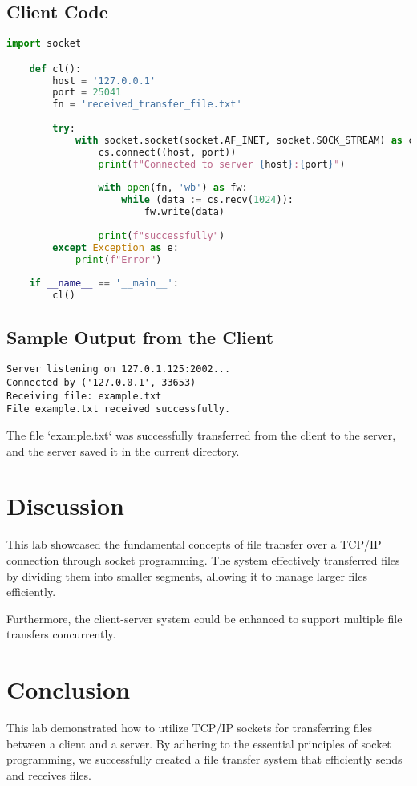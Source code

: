 \documentclass[a4paper,12pt]{article}
\begin{document}
\subsection{Client Code}

\begin{lstlisting}[language=Python, caption=Client Code]
    import socket

    def cl():
        host = '127.0.0.1'
        port = 25041
        fn = 'received_transfer_file.txt'
    
        try:
            with socket.socket(socket.AF_INET, socket.SOCK_STREAM) as cs:
                cs.connect((host, port))
                print(f"Connected to server {host}:{port}")
    
                with open(fn, 'wb') as fw:
                    while (data := cs.recv(1024)):
                        fw.write(data)
    
                print(f"successfully")
        except Exception as e:
            print(f"Error")
    
    if __name__ == '__main__':
        cl()
\end{lstlisting}

\subsection{Sample Output from the Client}

\begin{verbatim}
Server listening on 127.0.1.125:2002...
Connected by ('127.0.0.1', 33653)
Receiving file: example.txt
File example.txt received successfully.
\end{verbatim}

The file `example.txt` was successfully transferred from the client to the server, and the server saved it in the current directory.

\section{Discussion}
This lab showcased the fundamental concepts of file transfer over a TCP/IP connection through socket programming. The system effectively transferred files by dividing them into smaller segments, allowing it to manage larger files efficiently.

Furthermore, the client-server system could be enhanced to support multiple file transfers concurrently.

\section{Conclusion}
This lab demonstrated how to utilize TCP/IP sockets for transferring files between a client and a server. By adhering to the essential principles of socket programming, we successfully created a file transfer system that efficiently sends and receives files. 
\end{document}
